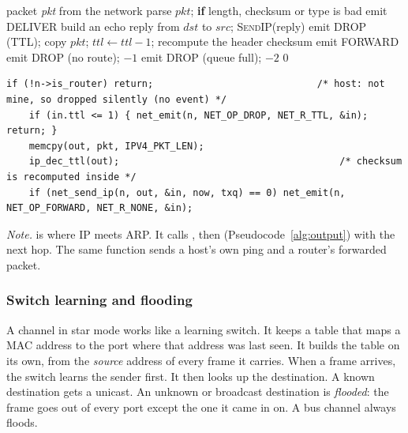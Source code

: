 \begin{algorithm}[H]\small
\caption{IPv4 receive and forward (,  lines 71--91)}
\label{alg:forward}
\begin{algorithmic}[1]
\Require packet \textit{pkt} from the network
\State parse $pkt$; \textbf{if} length, checksum or type is bad \Return {}
  \State emit DELIVER
    \State build an echo reply from $dst$ to $src$; \textsc{SendIP}(reply)
  \EndIf
  \State \Return
\EndIf
{} \Return {}
\EndIf
{} emit DROP (TTL); \Return
\EndIf
\State copy $pkt$; $ttl \gets ttl - 1$; recompute the header checksum
 \State emit FORWARD
\EndIf
\Statex
{} 
   emit DROP (no route); \Return $-1$
  \EndIf
   emit DROP (queue full); \Return $-2$
  \EndIf
  \State \Return $0$ 
\EndFunction
\end{algorithmic}
\end{algorithm}

\begin{lstlisting}[style=corelst, firstnumber=86, caption={\code{src/net.c}, lines 86--90: the forwarding step.}]
    if (!n->is_router) return;                             /* host: not mine, so dropped silently (no event) */
    if (in.ttl <= 1) { net_emit(n, NET_OP_DROP, NET_R_TTL, &in); return; }
    memcpy(out, pkt, IPV4_PKT_LEN);
    ip_dec_ttl(out);                                       /* checksum is recomputed inside */
    if (net_send_ip(n, out, &in, now, txq) == 0) net_emit(n, NET_OP_FORWARD, NET_R_NONE, &in);
\end{lstlisting}

\emph{Note.}  is where IP meets ARP. It calls , then  (Pseudocode~\ref{alg:output}) with the next hop. The same function sends a host's own ping and a router's forwarded packet.

\subsubsection{Switch learning and flooding}
A channel in star mode works like a learning switch. It keeps a table that maps a MAC address to the port where that address was last seen. It builds the table on its own, from the \emph{source} address of every frame it carries. When a frame arrives, the switch learns the sender first. It then looks up the destination. A known destination gets a unicast. An unknown or broadcast destination is \emph{flooded}: the frame goes out of every port except the one it came in on. A bus channel always floods.

